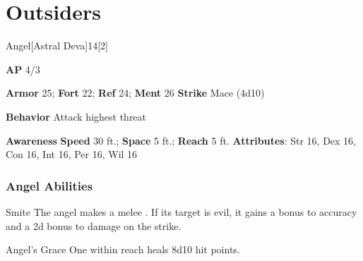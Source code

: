 \section{Outsiders}
\begin{monsection}{Angel}[Astral Deva]{14}[2]
\vspace{-1em}\vspace{-1em}
\begin{spellcontent}
\begin{spelltargetinginfo}
{\textbf{AP} 4/3}

\pari \textbf{Armor} 25;
\textbf{Fort} 22;
\textbf{Ref} 24;
\textbf{Ment} 26
\pari \textbf{Strike} Mace  (4d10)



\pari \textbf{Behavior} Attack highest threat
\end{spelltargetinginfo}
\end{spellcontent}

\begin{monsterfooter}
\pari \textbf{Awareness} 
\pari \textbf{Speed} 30 ft.;
\textbf{Space} 5 ft.;
\textbf{Reach} 5 ft.
\pari \textbf{Attributes}:
Str 16,
Dex 16,
Con 16,
Int 16,
Per 16,
Wil 16
\end{monsterfooter}
\end{monsection}


\subsubsection{Angel Abilities}

\begin{freeability}{Smite}
The angel makes a melee .
If its target is evil, it gains a  bonus to accuracy and a \plus2d bonus to damage on the strike.
\end{freeability}

\vspace{0.5em}
\begin{freeability}{Angel's Grace}
One  within reach heals 8d10 hit points.
\end{freeability}

